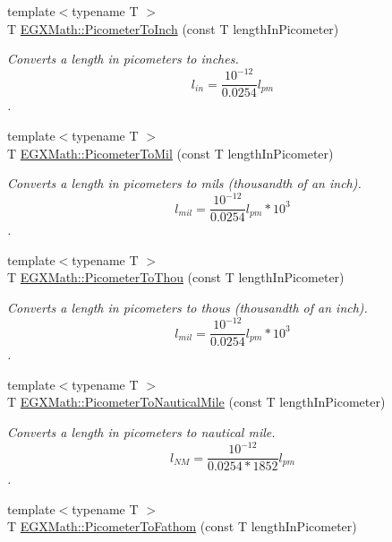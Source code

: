 \begin{DoxyCompactItemize}
{\footnotesize template$<$typename T $>$ }\\T \mbox{\hyperlink{group___e_g_x_math-_conversions-_length_conversions-_s_i-_picometer-_imperial_ga163afd72563986ed456466be07efd3cb}{E\+G\+X\+Math\+::\+Picometer\+To\+Inch}} (const T length\+In\+Picometer)
\begin{DoxyCompactList}\small\item\em Converts a length in picometers to inches. \[ l_{in}= \frac{10^{-12}}{0.0254} l_{pm} \]. \end{DoxyCompactList}\item 
{\footnotesize template$<$typename T $>$ }\\T \mbox{\hyperlink{group___e_g_x_math-_conversions-_length_conversions-_s_i-_picometer-_imperial_ga727778c82b4049ff45091f492993150d}{E\+G\+X\+Math\+::\+Picometer\+To\+Mil}} (const T length\+In\+Picometer)
\begin{DoxyCompactList}\small\item\em Converts a length in picometers to mils (thousandth of an inch). \[ l_{mil}= \frac{10^{-12}}{0.0254} l_{pm} * 10^{3} \]. \end{DoxyCompactList}\item 
{\footnotesize template$<$typename T $>$ }\\T \mbox{\hyperlink{group___e_g_x_math-_conversions-_length_conversions-_s_i-_picometer-_imperial_gabf48007bf90e25f6d23f847101fd35f1}{E\+G\+X\+Math\+::\+Picometer\+To\+Thou}} (const T length\+In\+Picometer)
\begin{DoxyCompactList}\small\item\em Converts a length in picometers to thous (thousandth of an inch). \[ l_{mil}= \frac{10^{-12}}{0.0254} l_{pm} * 10^{3} \]. \end{DoxyCompactList}\item 
{\footnotesize template$<$typename T $>$ }\\T \mbox{\hyperlink{group___e_g_x_math-_conversions-_length_conversions-_s_i-_picometer-_nautical_ga7127ef6c7c68736b7a24d2c65b8ac858}{E\+G\+X\+Math\+::\+Picometer\+To\+Nautical\+Mile}} (const T length\+In\+Picometer)
\begin{DoxyCompactList}\small\item\em Converts a length in picometers to nautical mile. \[ l_{NM}= \frac{10^{-12}}{0.0254 * 1852} l_{pm} \]. \end{DoxyCompactList}\item 
{\footnotesize template$<$typename T $>$ }\\T \mbox{\hyperlink{group___e_g_x_math-_conversions-_length_conversions-_s_i-_picometer-_nautical_ga1d8f092a0b6d47c4eaac5d9d19512d84}{E\+G\+X\+Math\+::\+Picometer\+To\+Fathom}} (const T length\+In\+Picometer)

\end{DoxyCompactItemize}
